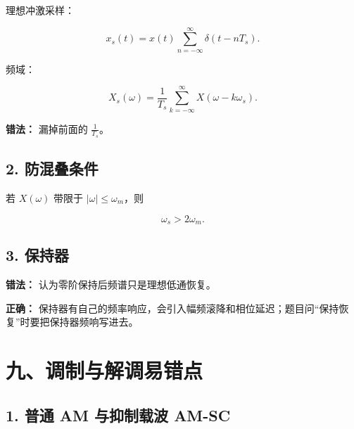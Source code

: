 \documentclass[11pt]{ctexart}
\begin{document}
理想冲激采样：\par

\[

x_s(t)=x(t)\sum_{n=-\infty}^{\infty}\delta(t-nT_s).

\]

频域：\par

\[

X_s(\omega)=\frac{1}{T_s}\sum_{k=-\infty}^{\infty}X(\omega-k\omega_s).

\]



\textbf{错法：} 漏掉前面的 \(\frac{1}{T_s}\)。\par



\subsection*{2. 防混叠条件}



若 \(X(\omega)\) 带限于 \(|\omega|\le \omega_m\)，则\par

\[

\omega_s>2\omega_m.

\]



\subsection*{3. 保持器}



\textbf{错法：} 认为零阶保持后频谱只是理想低通恢复。\par



\textbf{正确：} 保持器有自己的频率响应，会引入幅频滚降和相位延迟；题目问“保持恢复”时要把保持器频响写进去。\par



\section*{九、调制与解调易错点}



\subsection*{1. 普通 AM 与抑制载波 AM-SC}
\end{document}
